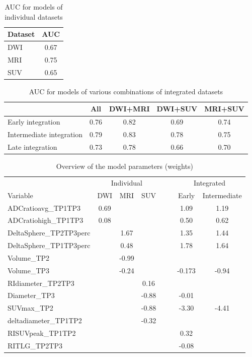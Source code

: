 \begin{table}
	\centering
	\begin{tabular}{lc}
		\toprule
		Dataset & AUC \\
		\midrule
		DWI & 0.67 \\
		MRI & 0.75 \\
		SUV & 0.65 \\
		\bottomrule
	\end{tabular}
	\caption{AUC for models of individual datasets}
	\label{tab:evaluation-auc-individual}
\end{table}
\begin{table}
	\centering
	\begin{tabular}{lcccc}
		\toprule
	 & All & DWI+MRI & DWI+SUV & MRI+SUV \\
		\midrule
		Early integration & 0.76 & 0.82 & 0.69 & 0.74 \\
		Intermediate integration & 0.79 & 0.83 & 0.78 & 0.75 \\
		Late integration & 0.73 & 0.78 & 0.66 & 0.70 \\
		\bottomrule
	\end{tabular}
	\caption{AUC for models of various combinations of integrated datasets}
	\label{tab:evaluation-auc-integrated}
\end{table}


\begin{table}
	\centering
	\begin{tabular}{lccccccc} 
		\toprule
		\multicolumn{1}{c}{}& \multicolumn{3}{c}{Individual} & \multicolumn{2}{c}{}&  \multicolumn{2}{c}{Integrated}\\ 
		\cmidrule{2-8}
		Variable & DWI    & MRI & SUV & & & Early    & Intermediate\\ 
		\midrule
		ADCratioavg\_TP1TP3 		& 0.69	& 		&  		& & & 1.09		& 1.19	\\ 
		ADCratiohigh\_TP1TP3 		& 0.08	&      	&  		& & & 0.50		& 0.62	\\ [10pt]
		DeltaSphere\_TP2TP3perc 	&      	& 1.67  &  		& & & 1.35		& 1.44  \\
		DeltaSphere\_TP1TP3perc 	&      	& 0.48  &  		& & & 1.78		& 1.64  \\
		Volume\_TP2 				&  		& -0.99 &   	& & & 			& 		\\
		Volume\_TP3 				&  		& -0.24 &   	& & & -0.173	& -0.94	\\ [10pt]
		RIdiameter\_TP2TP3 			&  		&      	& 0.16  & & & 			& 		\\
		Diameter\_TP3 				&  		&      	& -0.88 & & & -0.01		& 		\\
		SUVmax\_TP2 				&  		&      	& -0.88 & & & -3.30		& -4.41	\\
		deltadiameter\_TP1TP2 		&  		&      	& -0.32 & & & 			& 		\\
		RISUVpeak\_TP1TP2 			&  		&      	&  		& & & 0.32		& 		\\
		RITLG\_TP2TP3 				&  		&      	&  		& & & -0.08		& 		\\
		\bottomrule
	\end{tabular}
	\caption{Overview of the model parameters (weights)}
	\label{tab:evaluation-model-parameters}
\end{table}

